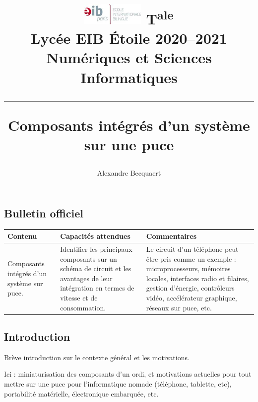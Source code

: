 \documentclass[a4paper,11pt]{article}
\title{
{\normalsize
\vspace*{-1.5cm}
\includegraphics[width=3cm]{eib_logo.jpg}
% 
\hfill
T\textsuperscript{ale}\\
Lycée EIB \'Etoile 2020--2021
\hfill
{\sc Numériques et Sciences Informatiques}
\hrule%
\vspace{5mm}%
}
{\sc Composants intégrés d'un système sur une puce}  %
}%
\author{Alexandre {\sc Becquaert}}
\begin{document}
\maketitle       %
\tableofcontents %
\thispagestyle{fancy} %

\subsection*{Bulletin officiel} %

\begin{center}
\begin{tabular}{|p{5cm}|p{5cm}|p{5cm}|}\hline
{\bf Contenu} & {\bf Capacités attendues} & {\bf Commentaires}\\\hline
Composants intégrés d'un système sur puce.
&
Identifier les principaux composants sur un schéma de circuit et les avantages de leur intégration en termes de vitesse et de consommation. 
&
Le circuit d'un téléphone peut être pris comme un exemple : microprocesseurs, mémoires locales, interfaces radio et filaires, gestion d'énergie, contrôleurs vidéo, accélérateur graphique, réseaux sur puce, etc.
\\\hline
\end{tabular}
\end{center}

\subsection*{Introduction}

Brève introduction sur le contexte général et les motivations.

Ici : miniaturisation des composants d'un ordi, et motivations actuelles pour tout mettre sur une puce pour l'informatique \og nomade \fg  (téléphone, tablette, etc), portabilité matérielle, électronique embarquée, etc.
\end{document}
